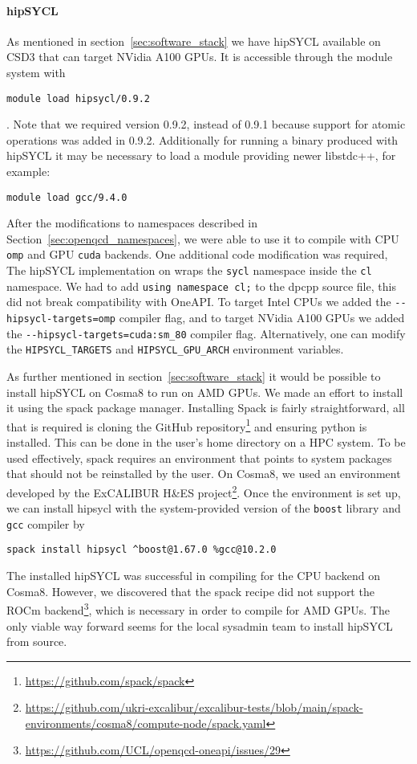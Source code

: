 \documentclass[../main]{subfiles}
\begin{document}
\paragraph{hipSYCL}

As mentioned in section~\ref{sec:software_stack} we have hipSYCL available on CSD3 that can target NVidia A100 GPUs.
It is accessible through the module system with
\begin{verbatim}
module load hipsycl/0.9.2
\end{verbatim}.
Note that we required version 0.9.2, instead of 0.9.1 because support for atomic operations was added in 0.9.2.
Additionally for running a binary produced with hipSYCL it may be necessary to load a module providing newer libstdc++, for example:
\begin{verbatim}
module load gcc/9.4.0
\end{verbatim}
After the modifications to namespaces described in Section~\ref{sec:openqcd_namespaces}, we were able to use it to compile with CPU \texttt{omp} and GPU \texttt{cuda} backends.
One additional code modification was required, The hipSYCL implementation on wraps the \texttt{sycl} namespace inside the \texttt{cl} namespace.
We had to add \verb !using namespace cl;! to the dpcpp source file, this did not break compatibility with OneAPI.
To target Intel CPUs we added the \verb !--hipsycl-targets=omp! compiler flag, and to target NVidia A100 GPUs we added the \verb !--hipsycl-targets=cuda:sm_80! compiler flag.
Alternatively, one can modify the \verb !HIPSYCL_TARGETS! and \verb !HIPSYCL_GPU_ARCH! environment variables.

As further mentioned in section~\ref{sec:software_stack} it would be possible to install hipSYCL on Cosma8 to run on AMD GPUs.
We made an effort to install it using the spack package manager.
Installing Spack is fairly straightforward, all that is required is cloning the GitHub repository\footnote{\url{https://github.com/spack/spack}} and ensuring python is installed.
This can be done in the user's home directory on a HPC system.
To be used effectively, spack requires an environment that points to system packages that should not be reinstalled by the user.
On Cosma8, we used an environment developed by the ExCALIBUR H\&ES project\footnote{\url{https://github.com/ukri-excalibur/excalibur-tests/blob/main/spack-environments/cosma8/compute-node/spack.yaml}}.
Once the environment is set up, we can install hipsycl with the system-provided version of the \texttt{boost} library and \texttt{gcc} compiler by
\begin{verbatim}
spack install hipsycl ^boost@1.67.0 %gcc@10.2.0
\end{verbatim}
The installed hipSYCL was successful in compiling for the CPU backend on Cosma8.
However, we discovered that the spack recipe did not support the ROCm backend\footnote{\url{https://github.com/UCL/openqcd-oneapi/issues/29}}, which is necessary in order to compile for AMD GPUs.
The only viable way forward seems for the local sysadmin team to install hipSYCL from source.
\end{document}
